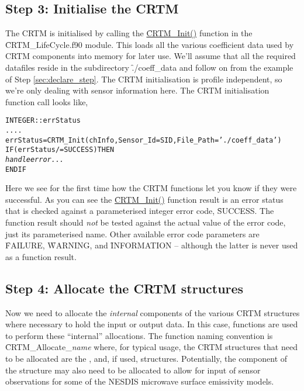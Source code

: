 \subsection{Step 3: Initialise the CRTM}
\label{sec:init_step}
The CRTM is initialised by calling the \hyperref[fig:init_interface]{\f{CRTM\_Init()}} function in the \f{CRTM\_LifeCycle.f90} module. This loads all the various coefficient data used by CRTM components into memory for later use. We'll assume that all the required datafiles reside in the subdirectory \f{./coeff\_data} and follow on from the example of Step \ref{sec:declare_step}. The CRTM initialisation is profile independent, so we're only dealing with sensor information here. The CRTM initialisation function call looks like,
\begin{alltt}
  INTEGER :: errStatus
  ....
  errStatus = CRTM_Init( chInfo, Sensor_Id=SID, File_Path='./coeff_data' )
  IF ( errStatus /= SUCCESS ) THEN 
    \textrm{\textit{handle error...}}
  END IF\end{alltt}

Here we see for the first time how the CRTM functions let you know if they were successful. As you can see the \hyperref[fig:init_interface]{\f{CRTM\_Init()}} function result is an error status that is checked against a parameterised integer error code, \f{SUCCESS}. The function result should \emph{not} be tested against the actual value of the error code, just its parameterised name. Other available error code parameters are \f{FAILURE}, \f{WARNING}, and \f{INFORMATION} -- although the latter is never used as a function result.


\subsection{Step 4: Allocate the CRTM structures}
Now we need to allocate the \emph{internal} components of the various CRTM structures where necessary to hold the input or output data. In this case, functions are used to perform these ``internal'' allocations. The function naming convention is \f{CRTM\_Allocate\_}\textit{name} where, for typical usage, the CRTM structures that need to be allocated are the \hyperref[sec:atmosphere_structure]{\Atmosphere}, \hyperref[sec:rtsolution_structure]{\RTSolution} and, if used, \hyperref[sec:options_structure]{\Options} structures. Potentially, the \hyperref[sec:sensordata_structure]{\SensorData} component of the \hyperref[sec:surface_structure]{\Surface} structure may also need to be allocated to allow for input of sensor observations for some of the NESDIS microwave surface emissivity models.

